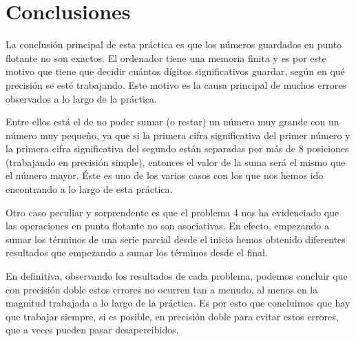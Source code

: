\documentclass[a4paper]{article}
\begin{document}
\section*{Conclusiones} 
La conclusión principal de esta práctica es que los números guardados en punto flotante no son exactos. El ordenador tiene una memoria finita y es por este motivo que tiene que decidir cuántos dígitos significativos guardar, según en qué precisión se esté trabajando. Este motivo es la causa principal de muchos errores observados a lo largo de la práctica.\par Entre ellos está el de no poder sumar (o restar) un número muy grande con un número muy pequeño, ya que si la primera cifra significativa del primer número y la primera cifra significativa del segundo están separadas por más de 8 posiciones (trabajando en precisión simple), entonces el valor de la suma será el mismo que el número mayor. Éste es uno de los varios casos con los que nos hemos ido encontrando a lo largo de esta práctica.\par Otro caso peculiar y sorprendente es que el problema 4 nos ha evidenciado que las operaciones en punto flotante no son asociativas. En efecto, empezando a sumar los términos de una serie parcial desde el inicio hemos obtenido diferentes resultados que empezando a sumar los términos desde el final.\par En definitiva, observando los resultados de cada problema, podemos concluir que con precisión doble estos errores no ocurren tan a menudo, al menos en la magnitud trabajada a lo largo de la práctica. Es por esto que concluimos que hay que trabajar siempre, si es posible, en precisión doble para evitar estos errores, que a veces pueden pasar desapercibidos.
\end{document}
